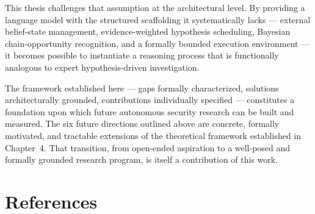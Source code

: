 \documentclass[12pt,a4paper,oneside,openany]{book}
\begin{document}
This thesis challenges that assumption at the architectural level. By providing a language model with the structured scaffolding it systematically lacks --- external belief-state management, evidence-weighted hypothesis scheduling, Bayesian chain-opportunity recognition, and a formally bounded execution environment --- it becomes possible to instantiate a reasoning process that is functionally analogous to expert hypothesis-driven investigation.

The framework established here --- gaps formally characterized, solutions architecturally grounded, contributions individually specified --- constitutes a foundation upon which future autonomous security research can be built and measured. The six future directions outlined above are concrete, formally motivated, and tractable extensions of the theoretical framework established in Chapter~4. That transition, from open-ended aspiration to a well-posed and formally grounded research program, is itself a contribution of this work.


\chapter*{References}
\end{document}
